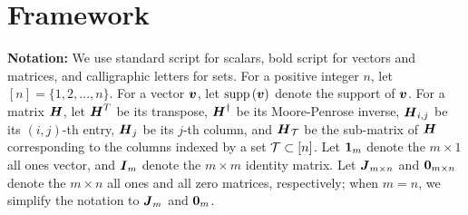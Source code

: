 \documentclass[conference,letterpaper]{IEEEtran}
\begin{document}



\section{Framework}
\label{sec:framework}

{\bf Notation:} We use standard script for scalars, bold script for vectors and matrices, and calligraphic letters for sets. For a positive integer $n$, let $[n] = \{1,2,\ldots,n\}$. %
For a vector $\boldsymbol{v}$, let $\mathrm{supp}\left(\boldsymbol{v}\right)$ denote the support of $\boldsymbol{v}$. For a matrix $\boldsymbol{H}$, let $\boldsymbol{H}^T$ be its transpose, $\boldsymbol{H}^{\dagger}$ be its Moore-Penrose inverse, $\boldsymbol{H}_{i,j}$ be its $(i,j)$-th entry, $\boldsymbol{H}_j$ be its $j$-th column, and $\boldsymbol{H}_{\mathcal{T}}$ be the sub-matrix of $\boldsymbol{H}$ corresponding to the columns indexed by a set $\mathcal{T}\subset[n]$. 
Let $\boldsymbol{1}_{m}$ denote the $m\times 1$ all ones vector, and $\boldsymbol{I}_{m}$ denote the $m\times m$ identity matrix. Let $\boldsymbol{J}_{m \times n}$ and $\boldsymbol{0}_{m \times n}$ denote the $m\times n$ all ones and all zero matrices, respectively; when $m = n$, we simplify the  notation to $\boldsymbol{J}_{m}$ and $\boldsymbol{0}_{m}$. 
\end{document}

